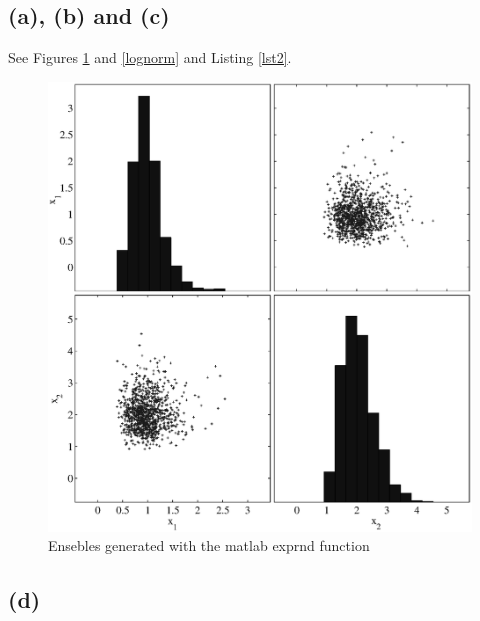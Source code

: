 \documentclass[fleqn, letterpaper]{tufte-handout}
\begin{document}
\subsection{(a), (b) and (c)}
See Figures \ref{norm} and \ref{lognorm} and Listing \ref{lst2}.
\begin{figure}
        \includegraphics[width=\textwidth]{problem2}
        \caption{Ensebles generated with the matlab {\ttfamily exprnd} function}
        \label{norm}
\end{figure}
\subsection{(d)}
\begin{minipage}{\linewidth}
        
\end{minipage}
\end{document}
